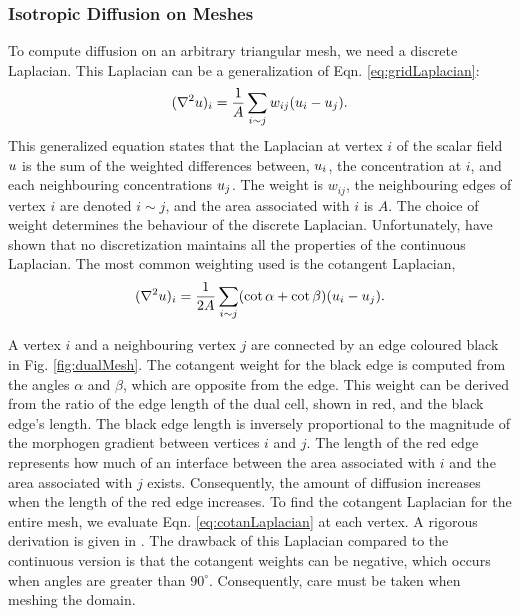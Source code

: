 \subsubsection*{Isotropic Diffusion on Meshes}
To compute diffusion on an arbitrary triangular mesh, we need a discrete Laplacian. This Laplacian can be a generalization of Eqn. \ref{eq:gridLaplacian}:
\begin{equation}
(\nabla^2{} u)_i = \frac{1}{A} \sum_{i \sim j} w_{ij}(u_i - u_j).
\end{equation}
This generalized equation states that the Laplacian at vertex $i$ of the scalar field $u$ is the sum of the weighted differences between, $u_i$, the concentration at $i$, and each neighbouring concentrations $u_j$. The weight is $w_{ij}$, the neighbouring edges of vertex $i$ are denoted $i \sim j$, and the area associated with $i$ is $A$. The choice of weight determines the behaviour of the discrete Laplacian. Unfortunately, \citet{wardetzky2007} have shown that no discretization maintains all the properties of the continuous Laplacian. The most common weighting used is the cotangent Laplacian,
\begin{equation}
	(\nabla^2{} u)_i = \frac{1}{2A} \sum_{i \sim j} (\cot{\alpha} + \cot{\beta)} (u_i - u_j).
	\label{eq:cotanLaplacian}
\end{equation}

A vertex $i$ and a neighbouring vertex $j$ are connected by an edge coloured black in Fig. \ref{fig:dualMesh}. The cotangent weight for the black edge is computed from the angles $\alpha$ and $\beta$, which are opposite from the edge. This weight can be derived from the ratio of the edge length of the dual cell, shown in red, and the black edge's length. The black edge length is inversely proportional to the magnitude of the morphogen gradient between vertices $i$ and $j$. The length of the red edge represents how much of an interface between the area associated with $i$ and the area associated with $j$ exists. Consequently, the amount of diffusion increases when the length of the red edge increases. To find the cotangent Laplacian for the entire mesh, we evaluate Eqn. \ref{eq:cotanLaplacian} at each vertex. A rigorous derivation is given in \citep{crane2013, herholz2013}. The drawback of this Laplacian compared to the continuous version is that the cotangent weights can be negative, which occurs when angles are greater than $90^\circ$. Consequently, care must be taken when meshing the domain.

